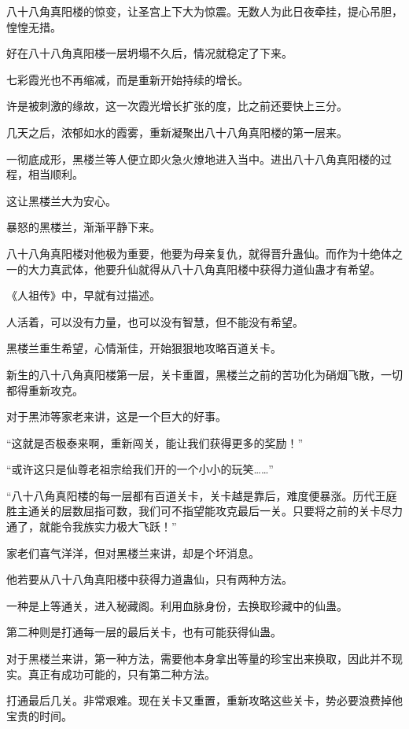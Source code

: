 
\begin{this_body}

八十八角真阳楼的惊变，让圣宫上下大为惊震。无数人为此日夜牵挂，提心吊胆，惶惶无措。

好在八十八角真阳楼一层坍塌不久后，情况就稳定了下来。

七彩霞光也不再缩减，而是重新开始持续的增长。

许是被刺激的缘故，这一次霞光增长扩张的度，比之前还要快上三分。

几天之后，浓郁如水的霞雾，重新凝聚出八十八角真阳楼的第一层来。

一彻底成形，黑楼兰等人便立即火急火燎地进入当中。进出八十八角真阳楼的过程，相当顺利。

这让黑楼兰大为安心。

暴怒的黑楼兰，渐渐平静下来。

八十八角真阳楼对他极为重要，他要为母亲复仇，就得晋升蛊仙。而作为十绝体之一的大力真武体，他要升仙就得从八十八角真阳楼中获得力道仙蛊才有希望。

《人祖传》中，早就有过描述。

人活着，可以没有力量，也可以没有智慧，但不能没有希望。

黑楼兰重生希望，心情渐佳，开始狠狠地攻略百道关卡。

新生的八十八角真阳楼第一层，关卡重置，黑楼兰之前的苦功化为硝烟飞散，一切都得重新攻克。

对于黑沛等家老来讲，这是一个巨大的好事。

“这就是否极泰来啊，重新闯关，能让我们获得更多的奖励！”

“或许这只是仙尊老祖宗给我们开的一个小小的玩笑……”

“八十八角真阳楼的每一层都有百道关卡，关卡越是靠后，难度便暴涨。历代王庭胜主通关的层数屈指可数，我们可不指望能攻克最后一关。只要将之前的关卡尽力通了，就能令我族实力极大飞跃！”

家老们喜气洋洋，但对黑楼兰来讲，却是个坏消息。

他若要从八十八角真阳楼中获得力道蛊仙，只有两种方法。

一种是上等通关，进入秘藏阁。利用血脉身份，去换取珍藏中的仙蛊。

第二种则是打通每一层的最后关卡，也有可能获得仙蛊。

对于黑楼兰来讲，第一种方法，需要他本身拿出等量的珍宝出来换取，因此并不现实。真正有成功可能的，只有第二种方法。

打通最后几关。非常艰难。现在关卡又重置，重新攻略这些关卡，势必要浪费掉他宝贵的时间。


\end{this_body}
